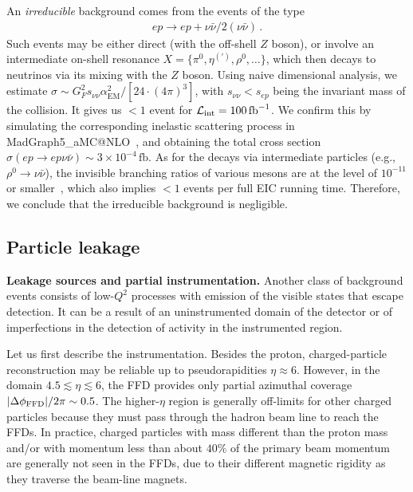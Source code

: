 \documentclass[aps,prd,preprintnumbers,superscriptaddress,nofootinbib,floatfix,twocolumn,notitlepage,reprint]{revtex4-2}
\newcommand{\cL}{\mathcal{L}}
\newcommand{\fb}{\mathrm{fb}}
\begin{document}
An \emph{irreducible} background comes from the events of the type 
%
\begin{align}
    e p 
    \to 
    e p + \nu\bar{\nu}/2(\nu\bar{\nu}) \, .
\end{align}
%
Such events may be either direct (with the off-shell $Z$ boson), or involve an intermediate on-shell resonance $X = \{\pi^{0},\eta^{(\prime)},\rho^{0},\dots\}$, which then decays to neutrinos via its mixing with the $Z$ boson. 
Using naive dimensional analysis, we estimate $\sigma \sim G_{F}^{2}s_{\nu\nu}\alpha_{\text{EM}}^{2}/[24\cdot (4\pi)^{3}]$, with $s_{\nu\nu}<s_{ep}$ being the invariant mass of the collision. 
It gives us $<1$ event for $\cL_{\rm int}=100\,\fb^{-1}$. 
We confirm this by simulating the corresponding inelastic scattering process in MadGraph5\_aMC@NLO~\cite{Alwall:2014hca}, and obtaining the total cross section $\sigma(ep\to ep\nu\bar\nu)\sim{3\times10^{-4}\,\fb}$.
As for the decays via intermediate particles (e.g., $\rho^{0}\to \nu\bar{\nu}$), the invisible branching ratios of various mesons are at the level of $10^{-11}$ or smaller~\cite{Gao:2018seg}, which also implies $<1$ events per full EIC running time.
Therefore, we conclude that the irreducible background is negligible.

\subsection{Particle leakage} 

\textbf{Leakage sources and partial instrumentation.} 
Another class of background events consists of low-$Q^{2}$ processes with emission of the visible states that escape detection. 
It can be a result of an uninstrumented domain of the detector or of imperfections in the detection of activity in the instrumented region.
 
Let us first describe the instrumentation.
Besides the proton, charged-particle reconstruction may be reliable up to pseudorapidities $\eta \approx 6$. 
However, in the domain $4.5 \lesssim \eta \lesssim 6$, the FFD provides only partial azimuthal coverage $|\Delta\phi_{\rm FFD}|/2\pi \sim 0.5$. 
The higher-$\eta$ region is generally off-limits for other charged particles because they must pass through the hadron beam line to reach the FFDs. 
In practice, charged particles with mass different than the proton mass and/or with momentum less than about $40\%$ of the primary beam momentum are generally not seen in the FFDs, due to their different magnetic rigidity as they traverse the beam-line magnets.
\end{document}
